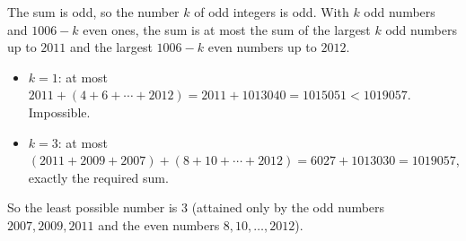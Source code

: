 The sum is odd, so the number $k$ of odd integers is odd. With $k$ odd numbers and $1006-k$ even ones, the sum is at most the sum of the largest $k$ odd numbers up to $2011$ and the largest $1006-k$ even numbers up to $2012$.
\begin{itemize}
\item $k=1$: at most $2011+(4+6+\cdots+2012)=2011+1013040=1015051<1019057$. Impossible.
\item $k=3$: at most $(2011+2009+2007)+(8+10+\cdots+2012)=6027+1013030=1019057$, exactly the required sum.
\end{itemize}
So the least possible number is $\boxed{3}$ (attained only by the odd numbers $2007,2009,2011$ and the even numbers $8,10,\dots,2012$).
